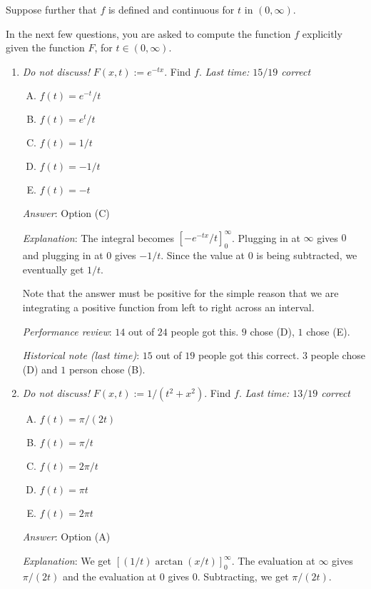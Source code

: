 \documentclass[10pt]{amsart}
\begin{document}
Suppose further that $f$ is defined and continuous for $t$ in
$(0,\infty)$.

In the next few questions, you are asked to compute the function $f$
explicitly given the function $F$, for $t \in (0,\infty)$.

\begin{enumerate}

\item {\em Do not discuss!} $F(x,t) := e^{-tx}$. Find $f$. {\em Last
  time: $15/19$ correct}

  \begin{enumerate}[(A)]
  \item $f(t) = e^{-t}/t$
  \item $f(t) = e^t/t$
  \item $f(t) = 1/t$
  \item $f(t) = -1/t$
  \item $f(t) = -t$
  \end{enumerate}

  {\em Answer}: Option (C)

  {\em Explanation}: The integral becomes
  $[-e^{-tx}/t]_0^\infty$. Plugging in at $\infty$ gives $0$ and
  plugging in at $0$ gives $-1/t$. Since the value at $0$ is being
  subtracted, we eventually get $1/t$.

  Note that the answer must be positive for the simple reason that we
  are integrating a positive function from left to right across an
  interval.

  {\em Performance review}: $14$ out of $24$ people got this. $9$
  chose (D), $1$ chose (E).

  {\em Historical note (last time)}: $15$ out of $19$ people got this
  correct. $3$ people chose (D) and $1$ person chose (B).

\item {\em Do not discuss!} $F(x,t) := 1/(t^2 + x^2)$. Find $f$. {\em
  Last time: $13/19$ correct}

  \begin{enumerate}[(A)]
  \item $f(t) = \pi/(2t)$
  \item $f(t) = \pi/t$
  \item $f(t) = 2\pi/t$
  \item $f(t) = \pi t$
  \item $f(t) = 2\pi t$
  \end{enumerate}

  {\em Answer}: Option (A)

  {\em Explanation}: We get $[(1/t)\arctan(x/t)]_0^\infty$. The
  evaluation at $\infty$ gives $\pi/(2t)$ and the evaluation at $0$
  gives $0$. Subtracting, we get $\pi/(2t)$.


\end{enumerate}
\end{document}
